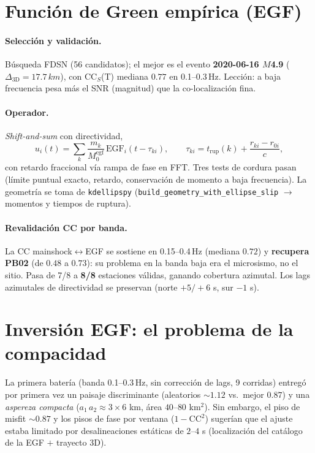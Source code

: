 \documentclass[11pt,a4paper]{article}
\newcommand{\km}{km}
\newcommand{\Hz}{Hz}
\newcommand{\SI}[2]{#1\,#2}
\newcommand{\SIrange}[3]{#1--#2\,#3}
\newcommand{\fn}[1]{\texttt{\small #1}}
\begin{document}
\section{Función de Green empírica (EGF)}
\paragraph{Selección y validación.} Búsqueda FDSN (56 candidatos); el mejor es
el evento \textbf{2020-06-16 $M$4.9} ($\Delta_\text{3D}=\SI{17.7}{\km}$),
con CC$_S$(T) mediana $0.77$ en \SIrange{0.1}{0.3}{\Hz}. Lección: a baja
frecuencia pesa más el SNR (magnitud) que la co-localización fina.

\paragraph{Operador.} \emph{Shift-and-sum} con directividad,
\begin{equation}
  u_i(t) = \sum_k \frac{m_k}{M_0^\text{egf}}\,
           \mathrm{EGF}_i\!\left(t-\tau_{ki}\right), \qquad
  \tau_{ki} = t_\text{rup}(k) + \frac{r_{ki}-r_{0i}}{c},
\end{equation}
con retardo fraccional vía rampa de fase en FFT. Tres tests de cordura pasan
(límite puntual exacto, retardo, conservación de momento a baja frecuencia).
La geometría se toma de \fn{kdellipspy}
(\fn{build\_geometry\_with\_ellipse\_slip} $\to$ momentos y tiempos de ruptura).

\paragraph{Revalidación CC por banda.} La CC mainshock$\leftrightarrow$EGF se
sostiene en \SIrange{0.15}{0.4}{\Hz} (mediana $0.72$) y \textbf{recupera PB02}
(de $0.48$ a $0.73$): su problema en la banda baja era el microsismo, no el
sitio. Pasa de 7/8 a \textbf{8/8} estaciones válidas, ganando cobertura
azimutal. Los lags azimutales de directividad se preservan
(norte $+5/+6$ s, sur $-1$ s).

\section{Inversión EGF: el problema de la compacidad}
La primera batería (banda \SIrange{0.1}{0.3}{\Hz}, sin corrección de lags,
9 corridas) entregó por primera vez un paisaje discriminante (aleatorios
$\sim 1.12$ vs.\ mejor $0.87$) y una \emph{aspereza compacta} ($a_1\,a_2 \approx
3\times6$ km, área $40$--$80$ km$^2$). Sin embargo, el piso de misfit
$\sim0.87$ y los pisos de fase por ventana ($1-\mathrm{CC}^2$) sugerían que el
ajuste estaba limitado por desalineaciones estáticas de $2$--$4$ s
(localización del catálogo de la EGF $+$ trayecto 3D).
\end{document}
